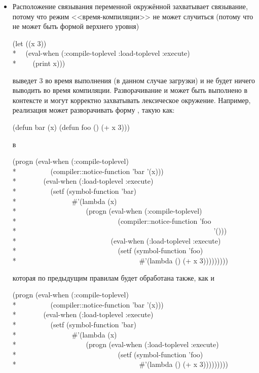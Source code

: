 \begin{newer}
\begin{defspec}
\begin{itemize}
  \item Расположение связывания переменной окружённой 
    захватывает связывание, потому что режим <<время-компиляции>> не может
    случиться (потому что  не может быть формой верхнего уровня)
\begin{lisp}
(let ((x 3)) \\*
~~(eval-when (:compile-toplevel :load-toplevel :execute) \\*
~~~~(print x)))
\end{lisp}
выведет 3 во время выполнения (в данном случае загрузки) и не будет ничего
выводить во время компиляции. Разворачивание  и  может
быть выполнено в контексте  и могут корректно захватывать
лексическое окружение.
Например, реализация может разворачивать форму , такую как:
\begin{lisp}
(defun bar (x) (defun foo () (+ x 3)))
\end{lisp}
в
\begin{lisp}
(progn (eval-when (:compile-toplevel) \\*
~~~~~~~~~(compiler::notice-function 'bar '(x))) \\*
~~~~~~~(eval-when (:load-toplevel :execute) \\*
~~~~~~~~~(setf (symbol-function 'bar) \\*
~~~~~~~~~~~~~~~\#'(lambda (x) \\*
~~~~~~~~~~~~~~~~~~~(progn (eval-when (:compile-toplevel)  \\*
~~~~~~~~~~~~~~~~~~~~~~~~~~~~(compiler::notice-function 'foo \\*
~~~~~~~~~~~~~~~~~~~~~~~~~~~~~~~~~~~~~~~~~~~~~~~~~~~~~~~'())) \\*
~~~~~~~~~~~~~~~~~~~~~~~~~~(eval-when (:load-toplevel :execute) \\*
~~~~~~~~~~~~~~~~~~~~~~~~~~~~(setf (symbol-function 'foo) \\*
~~~~~~~~~~~~~~~~~~~~~~~~~~~~~~~~~~\#'(lambda () (+ x 3)))))))))
\end{lisp}
которая по предыдущим правилам будет обработана также, как и 
\begin{lisp}
(progn (eval-when (:compile-toplevel) \\*
~~~~~~~~~(compiler::notice-function 'bar '(x))) \\*
~~~~~~~(eval-when (:load-toplevel :execute) \\*
~~~~~~~~~(setf (symbol-function 'bar) \\*
~~~~~~~~~~~~~~~\#'(lambda (x) \\*
~~~~~~~~~~~~~~~~~~~(progn (eval-when (:load-toplevel :execute) \\*
~~~~~~~~~~~~~~~~~~~~~~~~~~~~(setf (symbol-function 'foo) \\*
~~~~~~~~~~~~~~~~~~~~~~~~~~~~~~~~~~\#'(lambda () (+ x 3)))))))))
\end{lisp}


\end{itemize}
\end{defspec}
\end{newer}
